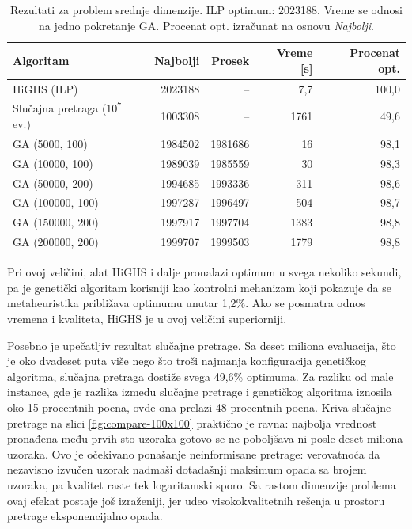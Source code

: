 \documentclass[12pt]{article}
\begin{document}
\begin{table}[H]
\centering
\begin{tabular}{|l|r|r|r|r|}
\hline
Algoritam & Najbolji & Prosek & Vreme [s] & Procenat opt. \\ \hline
HiGHS (ILP) & 2023188 & --      & 7,7   & 100,0 \\ \hline
Slučajna pretraga ($10^7$ ev.) & 1003308 & -- & 1761 & 49,6 \\ \hline
GA (5000, 100)     & 1984502 & 1981686 & 16   & 98,1 \\ \hline
GA (10000, 100)    & 1989039 & 1985559 & 30   & 98,3 \\ \hline
GA (50000, 200)    & 1994685 & 1993336 & 311  & 98,6 \\ \hline
GA (100000, 100)   & 1997287 & 1996497 & 504  & 98,7 \\ \hline
GA (150000, 200)   & 1997917 & 1997704 & 1383 & 98,8 \\ \hline
GA (200000, 200)   & 1999707 & 1999503 & 1779 & 98,8 \\ \hline
\end{tabular}
\caption{Rezultati za problem srednje dimenzije. ILP optimum: 2023188. Vreme se odnosi na jedno pokretanje GA. Procenat opt. izračunat na osnovu \textit{Najbolji}.}
\label{tab:r100}
\end{table}

Pri ovoj veličini, alat HiGHS i dalje pronalazi optimum u svega nekoliko sekundi, pa je genetički algoritam korisniji kao kontrolni mehanizam koji pokazuje da se metaheuristika približava optimumu unutar 1{,}2\%. Ako se posmatra odnos vremena i kvaliteta, HiGHS je u ovoj veličini superiorniji.

Posebno je upečatljiv rezultat slučajne pretrage. Sa deset miliona evaluacija, što je oko dvadeset puta više nego što troši najmanja konfiguracija genetičkog algoritma, slučajna pretraga dostiže svega 49,6\% optimuma. Za razliku od male instance, gde je razlika između slučajne pretrage i genetičkog algoritma iznosila oko 15 procentnih poena, ovde ona prelazi 48 procentnih poena. Kriva slučajne pretrage na slici \ref{fig:compare-100x100} praktično je ravna: najbolja vrednost pronađena među prvih sto uzoraka gotovo se ne poboljšava ni posle deset miliona uzoraka. Ovo je očekivano ponašanje neinformisane pretrage: verovatnoća da nezavisno izvučen uzorak nadmaši dotadašnji maksimum opada sa brojem uzoraka, pa kvalitet raste tek logaritamski sporo. Sa rastom dimenzije problema ovaj efekat postaje još izraženiji, jer udeo visokokvalitetnih rešenja u prostoru pretrage eksponencijalno opada.
\end{document}
